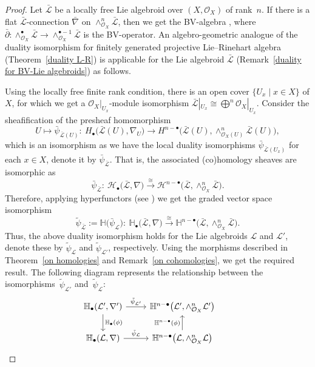 \documentclass[pdftex]{sigma}
\numberwithin{equation}{section}
\theoremstyle{definition}
\begin{document}
\begin{proof}
Let $\mathcal{\bar{L}}$ be a locally free Lie algebroid over $(X, \mathcal{O}_X)$ of rank~$n$. If there is a flat $\mathcal{\bar{L}}$-connection $\bar{\nabla}$ on $\wedge^n_{\mathcal{O}_X} \mathcal{\bar{L}}$, then we get the BV-algebra , where $\bar{\partial}\colon \wedge^{\bullet}_{\mathcal{O}_X} \mathcal{\bar{L}} \rightarrow \wedge^{\bullet -1}_{\mathcal{O}_X} \mathcal{\bar{L}}$ is the BV-operator. An algebro-geometric analogue of the duality isomorphism for finitely generated projective Lie--Rinehart algebra (Theorem~\ref{duality L-R}) is applicable for the Lie algebroid $\mathcal{\bar{L}}$ (Remark~\ref{duality for BV-Lie algebroids}) as follows.
	
Using the locally free finite rank condition, there is an open cover $\{U_x\mid x \in X\}$ of $X$, for which we get a $\mathcal{O}_X|_{U_x}$-module isomorphism $\mathcal{\bar{L}}|_{U_x} \cong \bigoplus^n \mathcal{O}_X|_{U_x}$. Consider the sheafification of the presheaf homomorphism
\[
U \mapsto \bar{\psi}_{\mathcal{\bar{L}}(U)}\colon \ H_{\bullet}\bigl(\mathcal{\bar{L}}(U), \nabla_U\bigr) \rightarrow H^{n-\bullet}\bigl(\mathcal{\bar{L}}(U), \wedge^n_{\mathcal{O}_X(U)} \mathcal{\bar{L}}(U)\bigr),
\]
	which is an isomorphism as we have the local duality isomorphisms $\bar{\psi}_{\mathcal{\bar{L}}(U_x)}$ for each $x \in X$, denote it by $\bar{\psi}_{\bar{\mathcal{L}}}$. That is, the associated (co)homology sheaves are isomorphic as
\[
\bar{\psi}_{\bar{\mathcal{L}}}\colon \ \mathcal{H}_{\bullet}\bigl(\mathcal{\bar{L}}, \nabla\bigr) \overset{\cong }{\rightarrow}\mathcal{H}^{n-\bullet} \bigl(\mathcal{\bar{L}}, \wedge^n_{\mathcal{O}_X} \mathcal{\bar{L}}\bigr).
\]
	Therefore, applying hyperfunctors (see \cite{UB, CW1}) we get the graded vector space isomorphism
\[
\tilde{\psi}_{\bar{\mathcal{L}}}:=\mathbb{H}\bigl(\bar{\psi}_{\mathcal{L}}\bigr)\colon \
 \mathbb{H}_{\bullet}\bigl(\mathcal{\bar{L}}, \nabla\bigr) \overset{\cong }{\rightarrow} \mathbb{H}^{n-\bullet} \bigl(\mathcal{\bar{L}}, \wedge^n_{\mathcal{O}_X} \mathcal{\bar{L}}\bigr).
 \]
Thus, the above duality isomorphism holds for the Lie algebroids $\mathcal{L}$ and $\mathcal{L}'$, denote these by $\tilde{\psi}_{\mathcal{L}}$ and $\tilde{\psi}_{\mathcal{L}'}$, respectively. Using the morphisms described in Theorem~\ref{on homologies} and Remark~\ref{on cohomologies}, we get the required result.
	The following diagram represents the relationship between the isomorphisms~$\tilde{\psi}_{\mathcal{L}'}$ and~$\tilde{\psi}_{\mathcal{L}}$:
\[
	\begin{tikzcd}
		{\mathbb{H}_{\bullet}(\mathcal{L}', \nabla')}
		\arrow[r, "{\tilde{\psi}_{\mathcal{L}'}}"]
		\arrow[d, "{\mathbb{H}_{\bullet}(\phi)}"]&
		{\mathbb{H}^{n-\bullet} \bigl(\mathcal{{L'}}, \wedge^n_{\mathcal{O}_X} \mathcal{{L'}}\bigr)}\\
		{\mathbb{H}_{\bullet}(\mathcal{L}, \nabla)}
		\arrow[r, "{\tilde{\psi}_{\mathcal{L}}}"]&
		{\mathbb{H}^{n-\bullet} \bigl(\mathcal{{L}}, \wedge^n_{\mathcal{O}_X} \mathcal{{L}}\bigr)}
		\arrow[u, "{\mathbb{H}^{n-\bullet}(\phi)}"]
	\end{tikzcd}\tag*{\qed}
\]\renewcommand{\qed}{}
\end{proof}
\end{document}
